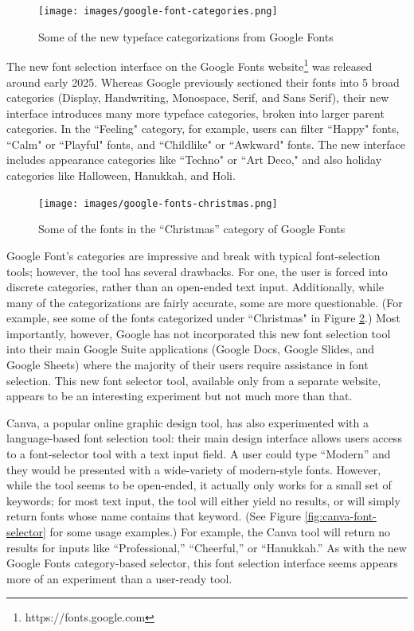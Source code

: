 \begin{figure}[ht]
    \centering
    \texttt{[image: images/google-font-categories.png]}
    \caption{Some of the new typeface categorizations from Google Fonts}
    \label{fig:google-font-categories}
\end{figure}

The new font selection interface on the Google Fonts website\footnote{https://fonts.google.com} was released around early 2025. Whereas Google previously sectioned their fonts into 5 broad categories (Display, Handwriting, Monospace, Serif, and Sans Serif), their new interface introduces many more typeface categories, broken into larger parent categories. In the ``Feeling" category, for example, users can filter ``Happy" fonts, ``Calm" or ``Playful" fonts, and ``Childlike" or ``Awkward" fonts. The new interface includes appearance categories like ``Techno" or ``Art Deco," and also holiday categories like Halloween, Hanukkah, and Holi.

\begin{figure}[H]
    \centering
    \texttt{[image: images/google-fonts-christmas.png]}
    \caption{Some of the fonts in the ``Christmas'' category of Google Fonts}
    \label{fig:google-fonts-christmas}
\end{figure}

Google Font's categories are impressive and break with typical font-selection tools; however, the tool has several drawbacks. For one, the user is forced into discrete categories, rather than an open-ended text input. Additionally, while many of the categorizations are fairly accurate, some are more questionable. (For example, see some of the fonts categorized under ``Christmas" in Figure \ref{fig:google-fonts-christmas}.) Most importantly, however, Google has not incorporated this new font selection tool into their main Google Suite applications (Google Docs, Google Slides, and Google Sheets) where the majority of their users require assistance in font selection. This new font selector tool, available only from a separate website, appears to be an interesting experiment but not much more than that.

Canva, a popular online graphic design tool, has also experimented with a language-based font selection tool: their main design interface allows users access to a font-selector tool with a text input field. A user could type ``Modern'' and they would be presented with a wide-variety of modern-style fonts. However, while the tool seems to be open-ended, it actually only works for a small set of keywords; for most text input, the tool will either yield no results, or will simply return fonts whose name contains that keyword. (See Figure \ref{fig:canva-font-selector} for some usage examples.) For example, the Canva tool will return no results for inputs like ``Professional,'' ``Cheerful,'' or ``Hanukkah.'' As with the new Google Fonts category-based selector, this font selection interface seems appears more of an experiment than a user-ready tool.

